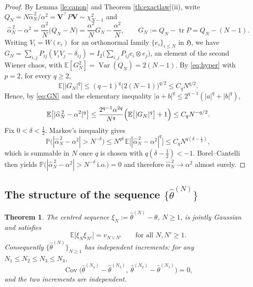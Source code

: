 \documentclass[11pt,reqno]{amsart}
\numberwithin{equation}{section}
\theoremstyle{plain}
\newtheorem{theorem}{Theorem}[section]
\theoremstyle{definition}
\theoremstyle{remark}
\newcommand{\bV}{\mathbf{V}}
\newcommand{\Prob}{\mathbb{P}}
\newcommand{\E}{\mathbb{E}}
\newcommand{\Hi}{\mathfrak{H}}
\DeclareMathOperator{\Var}{Var}
\DeclareMathOperator{\Cov}{Cov}
\DeclareMathOperator{\tr}{tr}
\begin{document}
\begin{proof}
By Lemma \ref{le:canon} and Theorem \ref{th:exactlaw}(ii), write
$Q_N=N\widehat\alpha^{\,2}_N/\alpha^{2}=\bV^{\top}P\bV\sim\chi^{2}_{N-1}$ and
\begin{equation}\label{eq:GN}
  \widehat\alpha^{\,2}_N-\alpha^{2}=\frac{\alpha^{2}}{N}\bigl(Q_N-N\bigr)
  =\frac{\alpha^{2}}{N}G_N-\frac{\alpha^{2}}{N},
  \qquad G_N:=Q_N-\tr P=Q_N-(N-1).
\end{equation}
Writing $V_i=W(e_i)$ for an orthonormal family $\{e_i\}_{i\le N}$ in $\Hi$, we have
$G_N=\sum_{i,j}P_{ij}(V_iV_j-\delta_{ij})
=I_2\bigl(\sum_{i,j}P_{ij}e_i\otimes e_j\bigr)$, an element of the second Wiener chaos,
with $\E[G_N^{2}]=\Var(Q_N)=2(N-1)$. By \eqref{eq:hyper} with $p=2$, for every $q\ge2$,
\[
  \E\bigl[|G_N|^{q}\bigr]\le(q-1)^{q}\bigl(2(N-1)\bigr)^{q/2}\le C_qN^{q/2}.
\]
Hence, by \eqref{eq:GN} and the elementary inequality
$|a+b|^{q}\le2^{q-1}(|a|^{q}+|b|^{q})$,
\[
  \E\bigl[|\widehat\alpha^{\,2}_N-\alpha^{2}|^{q}\bigr]
  \le\frac{2^{q-1}\alpha^{2q}}{N^{q}}\Bigl(\E\bigl[|G_N|^{q}\bigr]+1\Bigr)
  \le C_qN^{-q/2}.
\]
Fix $0<\delta<\frac12$. Markov's inequality gives
\[
  \Prob\bigl(|\widehat\alpha^{\,2}_N-\alpha^{2}|>N^{-\delta}\bigr)
  \le N^{q\delta}\,\E\bigl[|\widehat\alpha^{\,2}_N-\alpha^{2}|^{q}\bigr]
  \le C_qN^{q(\delta-\frac12)},
\]
which is summable in $N$ once $q$ is chosen with $q(\delta-\frac12)<-1$.
Borel--Cantelli then yields
$\Prob\bigl(|\widehat\alpha^{\,2}_N-\alpha^{2}|>N^{-\delta}\ \text{i.o.}\bigr)=0$ and
therefore $\widehat\alpha^{\,2}_N\to\alpha^{2}$ almost surely.
\end{proof}

\subsection{The structure of the sequence $\{\widehat\theta^{(N)}\}$}

\begin{theorem}\label{th:indincr}
The centred sequence $\xi_N:=\widehat\theta^{(N)}-\theta$, $N\ge1$, is jointly Gaussian
and satisfies
\begin{equation}\label{eq:covxi}
  \E\bigl[\xi_N\xi_{N'}\bigr]=v_{N\vee N'}\qquad\text{for all }N,N'\ge1 .
\end{equation}
Consequently $\{\widehat\theta^{(N)}\}_{N\ge1}$ has independent increments: for any
$N_1\le N_2\le N_3\le N_4$,
\[
  \Cov\bigl(\widehat\theta^{(N_4)}-\widehat\theta^{(N_3)},\
            \widehat\theta^{(N_2)}-\widehat\theta^{(N_1)}\bigr)=0,
\]
and the two increments are independent.
\end{theorem}
\end{document}
